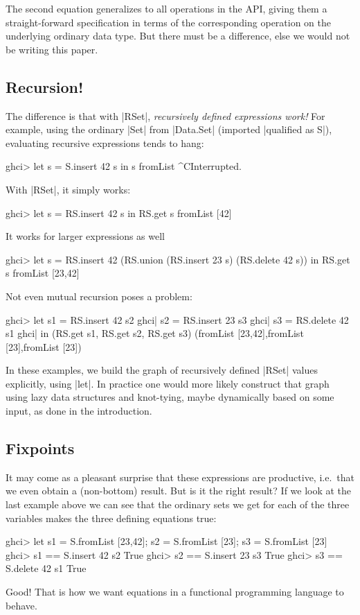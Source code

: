 \documentclass[manuscript,screen,acmsmall,nonacm]{acmart}
\begin{document}
The second equation generalizes to all operations in the API, giving them a straight-forward specification in terms of the corresponding operation on the underlying ordinary data type. But there must be a difference, else we would not be writing this paper.

\subsection{Recursion!}

The difference is that with |RSet|, \emph{recursively defined expressions work!} For example, using the ordinary |Set| from |Data.Set| (imported |qualified as S|), evaluating recursive expressions tends to hang:
\begin{code}
ghci> let s = S.insert 42 s in s
fromList ^CInterrupted.
\end{code}
With |RSet|, it simply works:
\begin{code}
ghci> let s = RS.insert 42 s in RS.get s
fromList [42]
\end{code}
It works for larger expressions as well
\begin{code}
ghci> let s = RS.insert 42 (RS.union (RS.insert 23 s) (RS.delete 42 s)) in RS.get s
fromList [23,42]
\end{code}
Not even mutual recursion poses a problem:
\begin{code}
ghci>  let  s1 = RS.insert 42 s2
ghci|       s2 = RS.insert 23 s3
ghci|       s3 = RS.delete 42 s1
ghci|  in (RS.get s1, RS.get s2, RS.get s3)
(fromList [23,42],fromList [23],fromList [23])
\end{code}

In these examples, we build the graph of recursively defined |RSet| values explicitly, using |let|. In practice one would more likely construct that graph using lazy data structures and knot-tying, maybe dynamically based on some input, as done in the introduction.

\subsection{Fixpoints}

It may come as a pleasant surprise that these expressions are productive, i.e.\ that we even obtain a (non-bottom) result. But is it the right result? If we look at the last example above we can see that the ordinary sets we get for each of the three variables makes the three defining equations true:
\begin{code}
ghci> let s1 = S.fromList [23,42]; s2 = S.fromList [23]; s3 = S.fromList [23]
ghci> s1 == S.insert 42 s2
True
ghci> s2 == S.insert 23 s3
True
ghci> s3 == S.delete 42 s1
True
\end{code}
Good! That is how we want equations in a functional programming language to behave.
\end{document}

